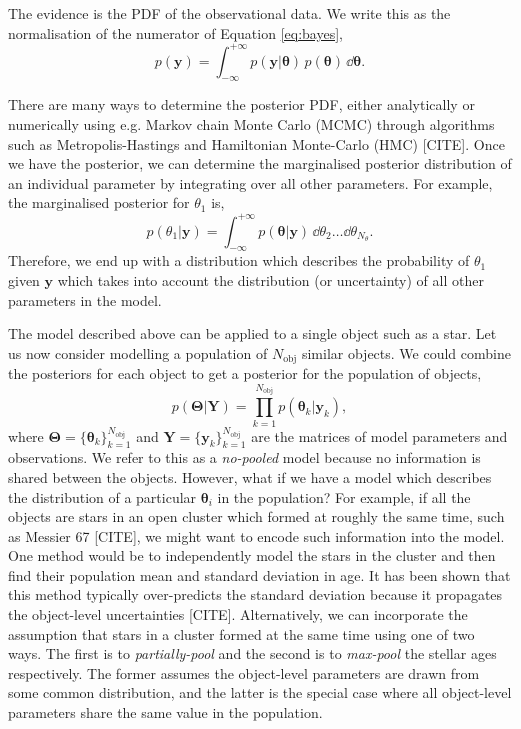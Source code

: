 The evidence is the PDF of the observational data. We write this as the normalisation of the numerator of Equation \ref{eq:bayes},
%
\begin{equation}
    p(\bm{y}) = \int_{-\infty}^{+\infty} p(\bm{y}|\bm{\theta})\,p(\bm{\theta})\,\dd \bm{\theta}.
\end{equation}
%

There are many ways to determine the posterior PDF, either analytically or numerically using e.g. Markov chain Monte Carlo (MCMC) through algorithms such as Metropolis-Hastings and Hamiltonian Monte-Carlo (HMC) [CITE]. Once we have the posterior, we can determine the marginalised posterior distribution of an individual parameter by integrating over all other parameters. For example, the marginalised posterior for $\theta_1$ is,
%
\begin{equation}
    p(\theta_1 | \bm{y}) = \int_{-\infty}^{+\infty} p(\bm{\theta} | \bm{y}) \, \dd \theta_2 \dots \dd \theta_{N_{\theta}}.
\end{equation}
%
Therefore, we end up with a distribution which describes the probability of $\theta_1$ given $\bm{y}$ which takes into account the distribution (or uncertainty) of all other parameters in the model.

The model described above can be applied to a single object such as a star. Let us now consider modelling a population of $N_\mathrm{obj}$ similar objects. We could combine the posteriors for each object to get a posterior for the population of objects,
%
\begin{equation}
    p(\bm{\Theta}|\bm{Y}) = \prod_{k=1}^{N_\mathrm{obj}} p(\bm{\theta}_k|\bm{y}_k),
\end{equation}
%
where $\bm{\Theta} = \{\bm{\theta}_k\}_{k=1}^{N_\mathrm{obj}}$ and $\bm{Y} = \{\bm{y}_k\}_{k=1}^{N_\mathrm{obj}}$ are the matrices of model parameters and observations. We refer to this as a \emph{no-pooled} model because no information is shared between the objects. However, what if we have a model which describes the distribution of a particular $\bm{\theta}_i$ in the population? For example, if all the objects are stars in an open cluster which formed at roughly the same time, such as Messier 67 [CITE], we might want to encode such information into the model. One method would be to independently model the stars in the cluster and then find their population mean and standard deviation in age. It has been shown that this method typically over-predicts the standard deviation because it propagates the object-level uncertainties [CITE]. Alternatively, we can incorporate the assumption that stars in a cluster formed at the same time using one of two ways. The first is to \emph{partially-pool} and the second is to \emph{max-pool} the stellar ages respectively. The former assumes the object-level parameters are drawn from some common distribution, and the latter is the special case where all object-level parameters share the same value in the population.

